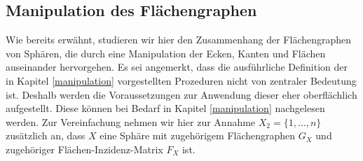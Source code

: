 \documentclass[12pt,titlepage,twoside,cleardoublepage]{article}
\theoremstyle{nummermitklammern}
\numberwithin{equation}{section}
\begin{document}
\subsection{Manipulation des Flächengraphen }
Wie bereits erwähnt, studieren wir hier den Zusammenhang der Flächengraphen von Sphären, die durch eine Manipulation der Ecken, Kanten und Flächen auseinander hervorgehen. Es sei angemerkt, dass die ausführliche Definition der in Kapitel \ref{manipulation} vorgestellten Prozeduren nicht von zentraler Bedeutung ist. Deshalb werden die Voraussetzungen zur Anwendung dieser eher oberflächlich aufgestellt. Diese können bei Bedarf in Kapitel \ref{manipulation} nachgelesen werden. Zur Vereinfachung nehmen wir hier zur Annahme $X_2  =\{1,\ldots,n\}$ zusätzlich an, dass $X$ eine Sphäre mit zugehörigem Flächengraphen $G_X$ und zugehöriger Flächen-Inzidenz-Matrix $F_X$ ist.
\end{document}
